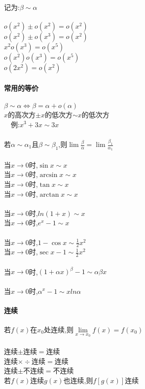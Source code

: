 \documentclass{article}
\begin{document}
\begin{flushleft}
	记为:$\beta \sim \alpha$\\
	~\\
	$o(x^2)\pm o(x^2)=o(x^2)$\\
	$o(x^2)\pm o(x^3)=o(x^2)$\\
	$x^2 o(x^3)=o(x^5)$\\
	$o(x^2) o(x^3)=o(x^5)$\\
	$o(2x^2)=o(x^2)$\\
	~\\ \textbf{常用的等价}\\~\\
	$\beta \sim \alpha \Leftrightarrow \beta = \alpha + o(\alpha)$\\
	$x$的高次方$\pm x$的低次方$\sim x$的低次方\\
	\ \ 例:$x^3+3x\sim 3x$\\
	~\\
	若$\alpha \sim \alpha_1$且$\beta \sim \beta_1$,则$\lim \frac{\beta}{\alpha} = \lim \frac{\beta_1}{\alpha_1}$\\
	~\\
	当$x\to 0$时,$\sin x \sim x$\\
	当$x\to 0$时,$\arcsin x \sim x$\\
	当$x\to 0$时,$\tan x \sim x$\\
	当$x\to 0$时,$\arctan x \sim x$\\
	~\\
	当$x\to 0$时,$ln(1+x) \sim x$\\
	当$x\to 0$时,$e^x-1 \sim x$\\
	~\\
	当$x\to 0$时,$1-\cos x \sim \frac{1}{2} x^2$\\
	当$x\to 0$时,$\sec x - 1 \sim \frac{1}{2} x^2$\\
	~\\
	当$x\to 0$时,$(1+\alpha x)^\beta -1 \sim \alpha\beta x$\\
	~\\
	当$x\to 0$时,$\alpha^x -1 \sim xln\alpha$\\
	~\\ \textbf{连续}\\~\\
	若$f(x)$在$x_0$处连续,则$\lim\limits_{x\to x_0} f(x)=f(x_0)$\\
	~\\
	连续$\pm$连续$=$连续\\
	连续$\times \div$连续$=$连续\\
	连续$\pm$不连续$=$不连续\\
	若$f(x)$连续$g(x)$也连续,则$f[g(x)]$连续\\

\end{flushleft}
\end{document}
